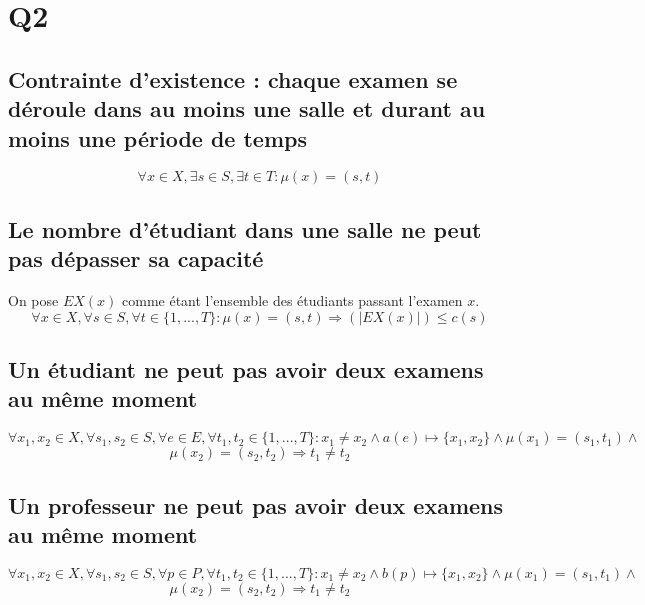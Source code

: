 \documentclass[a4paper,11pt]{article}
\begin{document}
\section{Q2}
\subsection{Contrainte d'existence : chaque examen se déroule dans au moins une salle et durant au moins une période de temps}
\begin{displaymath}
	\forall x \in X, \exists s \in S, \exists t \in T : \mu(x) = (s,t) 
\end{displaymath}

\subsection {Le nombre d'étudiant dans une salle ne peut pas dépasser sa capacité}
On pose $ EX(x) $ comme étant l'ensemble des étudiants passant l'examen $x$.
\begin{displaymath}
\forall x \in X , \forall s \in S, \forall t \in \{1,...,T\} : \mu(x) = (s,t) \Rightarrow (|EX(x)|) \leq c(s)
\end{displaymath}	

\subsection {Un étudiant ne peut pas avoir deux examens au même moment}
\begin{displaymath}
\forall x_{1},x_{2} \in X, \forall s_{1},s_{2} \in S , \forall e \in E ,\forall t_{1}, t_{2} \in \{1,...,T\} :  x_{1} \neq x_{2} \wedge a(e) \mapsto \{x_{1},x_{2}\}  \wedge \mu(x_{1}) = (s_{1},t_{1}) \wedge\end{displaymath}
\begin{displaymath}
 \mu(x_{2}) = (s_{2},t_{2}) \Rightarrow t_{1} \neq t_{2} 
\end{displaymath}

\subsection {Un professeur ne peut pas avoir deux examens au même moment}
\begin{displaymath}
\forall x_{1},x_{2} \in X, \forall s_{1},s_{2} \in S , \forall p \in P ,\forall t_{1}, t_{2} \in \{1,...,T\} :  x_{1} \neq x_{2} \wedge b(p) \mapsto \{x_{1},x_{2}\}  \wedge \mu(x_{1}) = (s_{1},t_{1}) \wedge\end{displaymath}
\begin{displaymath}
 \mu(x_{2}) = (s_{2},t_{2}) \Rightarrow t_{1} \neq t_{2} 
\end{displaymath}
\end{document}
